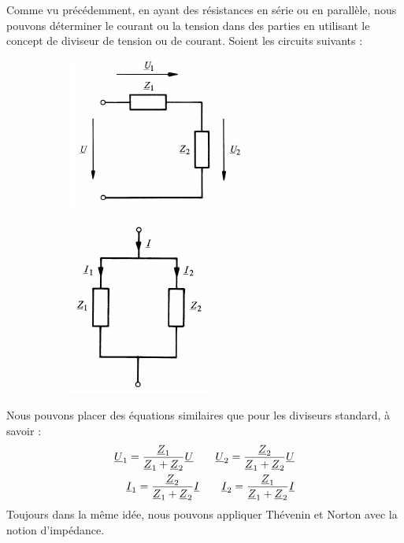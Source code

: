 \documentclass[12pt,a4paper]{article}
\newcommand{\uz}{\uline{Z} }
\newcommand{\ui}{\uline{I} }
\newcommand{\uu}{\uline{U} }
\begin{document}
 Comme vu précédemment, en ayant des résistances en série ou en parallèle, nous pouvons déterminer le courant ou la tension dans des parties en utilisant le concept de diviseur de tension ou de courant. Soient les circuits suivants :
\begin{figure}[!h]
	\centering
	\begin{subfigure}[b]{0.45\textwidth}
		\centering
		\includegraphics[scale=0.65]{images/diviseur_tension_impedance}
	\end{subfigure}
	\begin{subfigure}[b]{0.45\textwidth}
		\centering
		\includegraphics[scale=0.65]{images/diviseur_courant_impedance}
	\end{subfigure}
\end{figure}

Nous pouvons placer des équations similaires que pour les diviseurs standard, à savoir :
	\begin{align}
	\uu_1 = \frac{\uz_1}{\uz_1 + \uz_2}\uu \qquad \uu_2 = \frac{\uz_2}{\uz_1 + \uz_2}\uu\\
	\ui_1 = \frac{\uz_2}{\uz_1 + \uz_2}\ui \qquad \ui_2 = \frac{\uz_1}{\uz_1 + \uz_2}\ui
	\end{align}
 Toujours dans la même idée, nous pouvons appliquer Thévenin et Norton avec la notion d'impédance. \\
\end{document}
